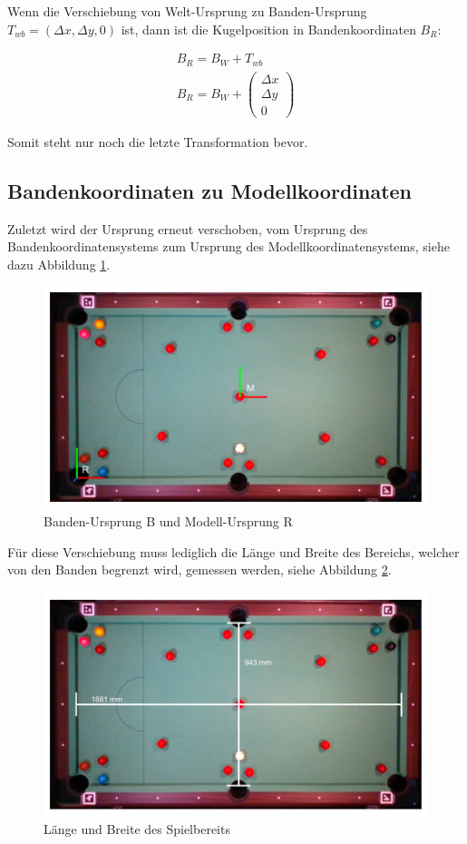Wenn die Verschiebung von Welt-Ursprung zu Banden-Ursprung $T_{wb} = (\Delta x, \Delta y, 0)$ ist, dann ist
die Kugelposition in Bandenkoordinaten $B_R$:

\begin{align}
B_R = B_W + T_{wb}\\
B_R = B_W + \begin{pmatrix}\Delta x\\\Delta y\\0\end{pmatrix}
\end{align}

Somit steht nur noch die letzte Transformation bevor.


\subsection{Bandenkoordinaten zu Modellkoordinaten}\label{kap:rail_to_model}

Zuletzt wird der Ursprung erneut verschoben, vom Ursprung des Bandenkoordinatensystems zum
Ursprung des Modellkoordinatensystems, siehe dazu Abbildung \ref{fig:table_rail_to_model}.

\begin{figure}[h!]
    \begin{center}
    \includegraphics[width=0.6\linewidth]{../common/resources/coordinate_systems/table_rail_to_model.png}
    \end{center}
    \caption{Banden-Ursprung B und Modell-Ursprung R}
    \label{fig:table_rail_to_model}
\end{figure}

Für diese Verschiebung muss lediglich die Länge und Breite des Bereichs, welcher von den Banden begrenzt wird,
gemessen werden, siehe Abbildung \ref{fig:table_inner_lengths}.

\begin{figure}[h!]
    \begin{center}
    \includegraphics[width=0.6\linewidth]{../common/resources/coordinate_systems/table_inner_lengths.png}
    \end{center}
    \caption{Länge und Breite des Spielbereits}
    \label{fig:table_inner_lengths}
\end{figure}


